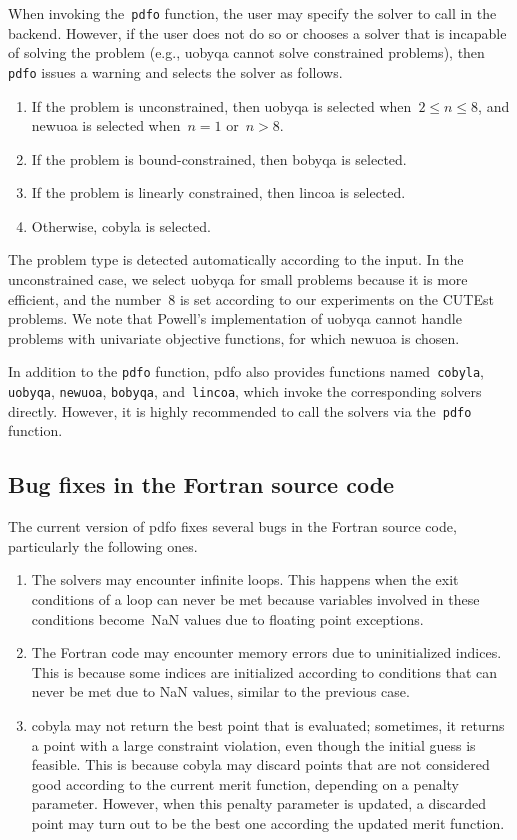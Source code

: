 \documentclass[
    smallextended,  %
    final,        %
]{svjour3}
\newcommand{\pdfofun}{\texttt{pdfo}\xspace}
\newcommand{\cobylafun}{\texttt{cobyla}\xspace}
\newcommand{\newuoafun}{\texttt{newuoa}\xspace}
\newcommand{\bobyqafun}{\texttt{bobyqa}\xspace}
\newcommand{\lincoafun}{\texttt{lincoa}\xspace}
\begin{document}
When invoking the~\pdfofun function, the user may specify the solver to call in the backend.
However, if the user does not do so or chooses a solver that is incapable of solving the problem (e.g., \gls{uobyqa} cannot solve
constrained problems), then \pdfofun issues a warning and selects the solver as follows.
\begin{enumerate}
    \item If the problem is unconstrained, then \gls{uobyqa} is selected when~$2 \le n \le 8$, and \gls{newuoa} is selected when~$n = 1$ or~$n > 8$.
    \item If the problem is bound-constrained, then \gls{bobyqa} is selected.
    \item If the problem is linearly constrained, then \gls{lincoa} is selected.
    \item Otherwise, \gls{cobyla} is selected.
\end{enumerate}
The problem type is detected automatically according to the input.
In the unconstrained case, we select \gls{uobyqa} for small problems because it is more efficient,
and the number~$8$ is set according to our experiments on the CUTEst~\cite{Gould_Orban_Toint_2015} problems.
We note that Powell's implementation of \gls{uobyqa} cannot handle problems with univariate
objective functions, for which \gls{newuoa} is chosen.

In addition to the \pdfofun function, \gls{pdfo} also provides functions named~\cobylafun,
\texttt{uobyqa}, \newuoafun, \bobyqafun, and~\lincoafun, which invoke the
corresponding solvers directly. However, it is highly recommended to call the solvers
via the~\pdfofun function.

\subsection{Bug fixes in the Fortran source code}
\label{subsec:bug-corrections}

The current version of \gls{pdfo} fixes several bugs in the Fortran source code, particularly the following ones.
\begin{enumerate}
    \item The solvers may encounter infinite loops.
    This happens when the exit conditions of a loop can never be met because variables involved in
    these conditions become~NaN values due to floating point exceptions.
    \item The Fortran code may encounter memory errors due to uninitialized indices.
    This is because some indices are initialized according to conditions that can never be met due to NaN values, similar to the previous case.
    \item \Gls{cobyla} may not return the best point that is evaluated; sometimes, it returns a point with a large constraint violation, even though the initial guess is feasible.
    This is because \gls{cobyla} may discard points that are not considered good according to the current merit function, depending on a penalty parameter.
    However, when this penalty parameter is updated, a discarded point may turn out to be the best
    one according the updated merit function.
\end{enumerate}
\end{document}
